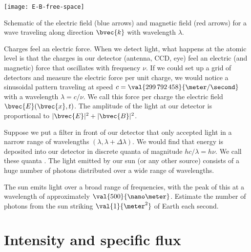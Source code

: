 \begin{marginfigure}
\texttt{[image: E-B-free-space]}
\caption[The electric force in a light wave]{Schematic of the electric field (blue arrows) and magnetic field (red arrows) for a wave traveling along direction $\bvec{k}$ with wavelength $\lambda$.}
\label{f.light-wave}
\end{marginfigure}
Charges feel an electric force.
When we detect light, what happens at the atomic level is that the charges in our detector (antenna, CCD, eye) feel an electric (and magnetic) force that oscillates with frequency $\nu$. If we could set up a grid of detectors and measure the electric force per unit charge, we would notice a sinusoidal pattern traveling at speed $c = \val{299\,792\,458}{\meter/\second}$ with a wavelength $\lambda = c/\nu$.  We call this force per charge the electric field $\bvec{E}(\bvec{x},t)$. The amplitude of the light at our detector is proportional to $|\bvec{E}|^{2} + |\bvec{B}|^{2}$.

Suppose we put a filter in front of our detector that only accepted light in a narrow range of wavelengths $(\lambda,\lambda+\Delta\lambda)$. We would find that energy is deposited into our detector in discrete quanta of magnitude $hc/\lambda = h\nu$. We call these quanta . The light emitted by our sun (or any other source) consists of a huge number of photons distributed over a wide range of wavelengths.

\begin{exercisebox}
The sun emits light over a broad range of frequencies, with the peak of this  at a wavelength of approximately $\val{500}{\nano\meter}$. Estimate the number of photons from the sun striking $\val{1}{\meter^{2}}$ of Earth each second.
\end{exercisebox}

\section{Intensity and specific flux}
\label{s.intensity-specific-flux}

